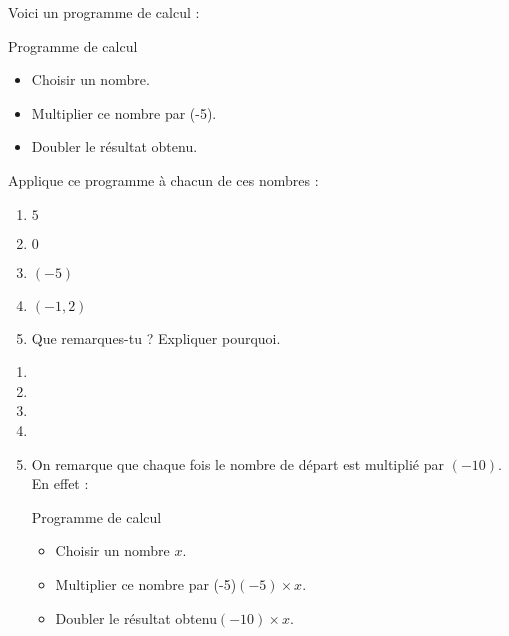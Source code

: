 \begin{exercice*}
    Voici un programme de calcul :
    \begin{myProgCalculBox}{Programme de calcul}
        \begin{itemize}
            \item Choisir un nombre.
            \item Multiplier ce nombre par (-5).
            \item Doubler le résultat obtenu.
        \end{itemize}
    \end{myProgCalculBox}

        Applique ce programme à chacun de ces nombres :
        \begin{enumerate}
            \item $ 5 $
            \item $ 0 $
            \item $ (-5) $
            \item $ (-1,2) $
            \item Que remarques-tu ? Expliquer pourquoi.
        \end{enumerate}
\end{exercice*}
\begin{corrige}
    \phantom{rrr}    
        \begin{enumerate}
            \item {}
            \item {}
            \item {}
            \item {}
            \item On remarque que chaque fois le nombre de départ est multiplié par $(-10)$. En effet :
            \begin{myProgCalculBox}{Programme de calcul}
                \begin{itemize}
                    \item Choisir un nombre \dotfill $x$.
                    \item Multiplier ce nombre par (-5)\dotfill $(-5)\times x $.
                    \item Doubler le résultat obtenu\dotfill $(-10)\times x$.
                \end{itemize}
            \end{myProgCalculBox}        
        \end{enumerate}
\end{corrige}